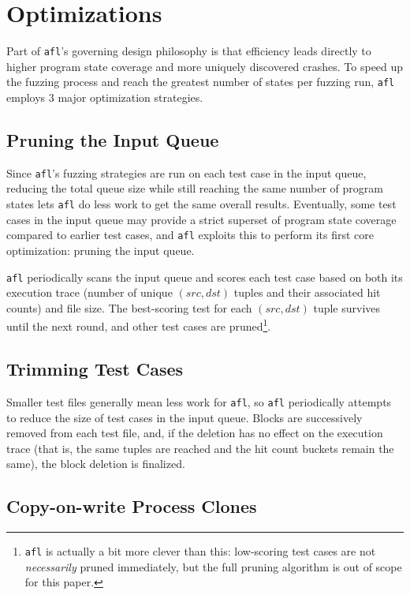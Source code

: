 \section{Optimizations}
\label{sec:optimizations}

Part of \texttt{afl}'s governing design philosophy is that efficiency
leads directly to higher program state coverage and more uniquely discovered
crashes. To speed up the fuzzing process and reach the greatest number
of states per fuzzing run, \texttt{afl} employs 3 major optimization
strategies\cite{afl-whitepaper}.

\subsection{Pruning the Input Queue}

Since \texttt{afl}'s fuzzing strategies are run on each test case in the
input queue, reducing the total queue size while still reaching the same
number of program states lets \texttt{afl} do less work to get the same
overall results. Eventually, some test cases in the input queue may
provide a strict superset of program state coverage compared to earlier
test cases, and \texttt{afl} exploits this to perform its first core
optimization: pruning the input queue.

\texttt{afl} periodically scans the input queue and scores each test case
based on both its execution trace (number of unique $(src, dst)$ tuples and
their associated hit counts) and file size. The best-scoring test for
each $(src, dst)$ tuple survives until the next round, and other test
cases are pruned\footnote{\texttt{afl} is actually a bit more clever than this: low-scoring test cases are not \textit{necessarily} pruned immediately, but the full pruning algorithm is out of scope for this paper.}.

\subsection{Trimming Test Cases}

Smaller test files generally mean less work for \texttt{afl}, so \texttt{afl}
periodically attempts to reduce the size of test cases in the input queue.
Blocks are successively removed from each test file, and, if the deletion
has no effect on the execution trace (that is, the same tuples are reached
and the hit count buckets remain the same), the block deletion is finalized.

\subsection{Copy-on-write Process Clones}

